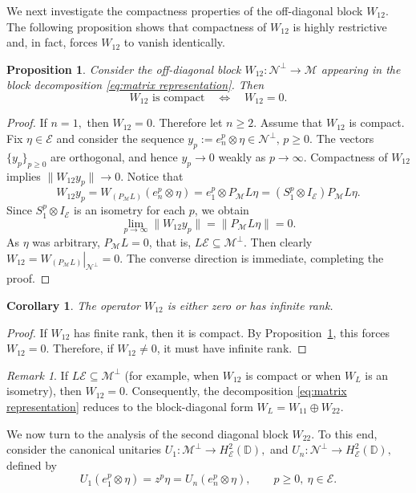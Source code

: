 \documentclass[12pt]{amsart}
\newtheorem{corollary}[theorem]{Corollary}
\newtheorem{proposition}[theorem]{Proposition}
\theoremstyle{definition}
\theoremstyle{remark}
\newtheorem{remark}[theorem]{Remark}
\def \D{\mathbb{D}}
\newcommand{\cle}{\mathcal{E}}
\newcommand{\clm}{\mathcal{M}}
\newcommand{\cln}{\mathcal{N}}
\newcommand\restr[2]{\ensuremath{\left.#1\right|_{#2}}}
\numberwithin{equation}{section}
\begin{document}
We next investigate the compactness properties of the off-diagonal block $W_{12}$. The following proposition shows that compactness of $W_{12}$ is highly restrictive and, in fact, forces $W_{12}$ to vanish identically.


\begin{proposition}\label{prop:W12_compactness}
Consider the off-diagonal block $W_{12}:\cln^\perp \to \clm$ appearing in the block decomposition \eqref{eq:matrix representation}. Then
\[
W_{12} \text{ is compact}
\quad \Longleftrightarrow \quad
W_{12}=0.
\]
\end{proposition}
\begin{proof}
If $n=1,$ then $W_{12}=0$. Therefore let $n \geq 2$. Assume that $W_{12}$ is compact. Fix $\eta\in\cle$ and consider the sequence $y_p:=e_n^p\otimes \eta\in \cln^\perp,\, p\ge 0.$
The vectors $\{y_p\}_{p\ge 0}$ are orthogonal, and hence $y_p\to 0$ weakly as $p\to\infty$. Compactness of $W_{12}$ implies $\|W_{12}y_p\|\to 0.$ Notice that
\[
W_{12}y_p
=
W_{(P_{\clm}L)}(e_n^p\otimes \eta)
=
e_1^p\otimes P_{\clm}L\eta
=
(S_1^p\otimes I_\cle)P_{\clm}L\eta.
\]
Since $S_1^p\otimes I_\cle$ is an isometry for each $p$, we obtain
\[
\lim_{p \to \infty} \|W_{12} y_p\| =\|P_{\clm}L\eta\|= 0.
\]
As $\eta$ was arbitrary, $P_{\clm}L=0$, that is, $L\cle \subseteq \clm^\perp$.
Then clearly  $W_{12}=\restr{W_{(P_{\clm} L)}}{\cln^\perp} =0.$ The converse direction is immediate, completing the proof.
\end{proof}

\begin{corollary}
The operator $W_{12}$ is either zero or has infinite rank.
\end{corollary}
\begin{proof}
If $W_{12}$ has finite rank, then it is compact. By Proposition~\ref{prop:W12_compactness}, this forces $W_{12}=0.$
Therefore, if $W_{12}\neq 0$, it must have infinite rank.
\end{proof}


\begin{remark}
If $L\cle \subseteq \clm^\perp$ (for example, when $W_{12}$ is compact or when $W_L$ is an isometry), then $W_{12}=0$. Consequently, the decomposition \eqref{eq:matrix representation} reduces to the block-diagonal form $W_L = W_{11} \oplus W_{22}.$    
\end{remark}

We now turn to the analysis of the second diagonal block $W_{22}$. To this end, consider the canonical unitaries $U_1:\clm^\perp \to H^2_{\cle}(\D),$ and $U_n:\cln^\perp \to H^2_{\cle}(\D),$
defined by
\[
U_1(e_1^{p}\otimes \eta)=z^p\eta
=
U_n(e_n^{p}\otimes \eta),
\qquad p\ge 0,\ \eta\in\cle.
\]
\end{document}
